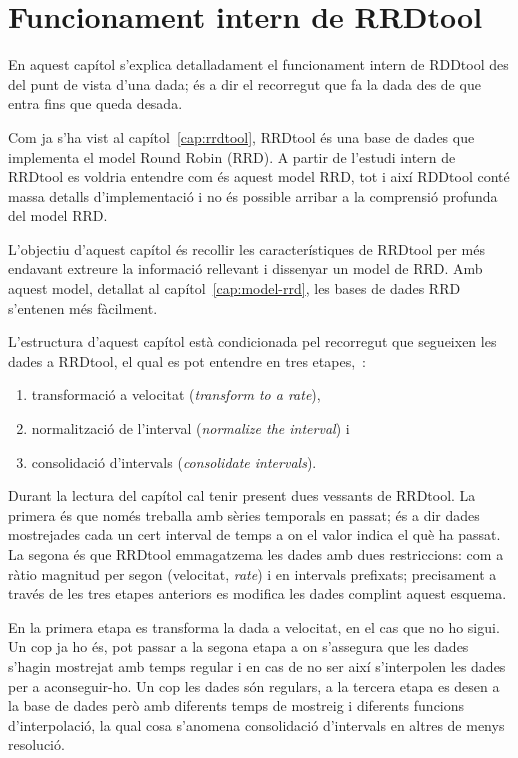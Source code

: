 \chapter{Funcionament intern de RRDtool}
\label{cap:rrdtool-etapes}

En aquest capítol s'explica detalladament el funcionament intern de RDDtool des del punt de vista d'una dada; és a dir el recorregut que fa la dada des de que entra fins que queda desada.

Com ja s'ha vist al capítol~\ref{cap:rrdtool}, RRDtool és una base de dades que implementa el model Round Robin (RRD). A partir de l'estudi intern de RRDtool es voldria entendre com és aquest model RRD, tot i així RDDtool conté massa detalls d'implementació i no és possible arribar a la comprensió profunda del model RRD. 

L'objectiu d'aquest capítol és recollir les característiques de RRDtool per més endavant extreure la informació rellevant i dissenyar un model de RRD. Amb aquest model, detallat al capítol~\ref{cap:model-rrd}, les bases de dades RRD s'entenen més fàcilment.
 

L'estructura d'aquest capítol està condicionada pel recorregut que
segueixen les dades a RRDtool, el qual es pot entendre en tres
etapes,~\cite{vandenbogaerdt,rrdtool}:

\begin{enumerate}
\item transformació a velocitat (\emph{transform to a rate}),
\item normalització de l'interval (\emph{normalize the interval}) i
\item consolidació d'intervals (\emph{consolidate intervals}).
\end{enumerate}

Durant la lectura del capítol cal tenir present dues vessants de RRDtool. La primera és que només treballa amb sèries temporals en passat; és a dir dades mostrejades cada un cert interval de temps a on el valor indica el què ha passat. La segona és que RRDtool emmagatzema les dades amb dues restriccions: com a ràtio magnitud per segon (velocitat, \emph{rate}) i en intervals prefixats; precisament a través de les tres etapes anteriors es modifica les dades complint aquest esquema.

En la primera etapa es transforma la dada a velocitat, en el cas que no ho sigui. Un cop ja ho és, pot passar a la segona etapa a on s'assegura que les dades s'hagin mostrejat amb temps regular i en cas de no ser així s'interpolen les dades per a aconseguir-ho. Un cop les dades són regulars, a la tercera etapa es desen a la base de dades però amb diferents temps de mostreig i diferents funcions d'interpolació, la qual cosa s'anomena consolidació d'intervals en altres de menys resolució. 


